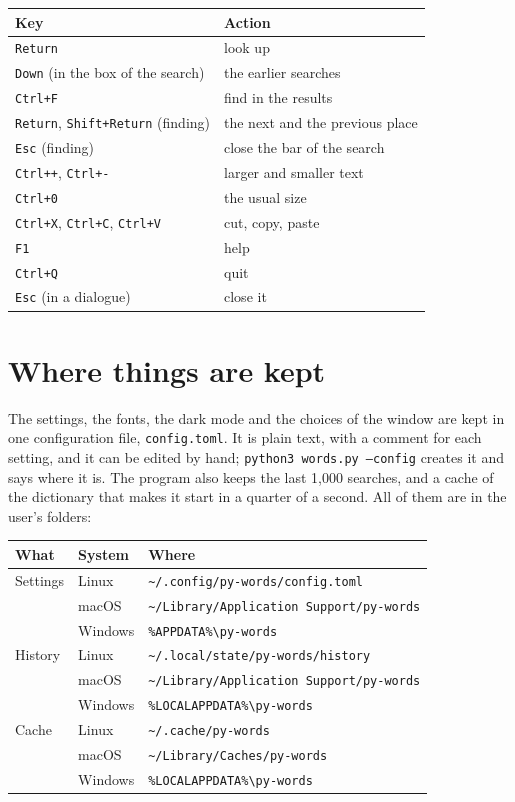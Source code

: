 \documentclass[12pt,
              article,
              oneside
              ]{memoir}
\newcommand*{\key}[1]{\texttt{#1}}
\begin{document}
%
\begin{longtable}{@{}>{\raggedright}p{}p{}@{}}
\toprule
Key & Action\\
\midrule
\endhead
\key{Return} & look up\\
\key{Down} (in the box of the search) & the earlier searches\\
\key{Ctrl+F} & find in the results\\
\key{Return}, \key{Shift+Return} (finding) & the next and the previous place\\
\key{Esc} (finding) & close the bar of the search\\
\key{Ctrl++}, \key{Ctrl+-} & larger and smaller text\\
\key{Ctrl+0} & the usual size\\
\key{Ctrl+X}, \key{Ctrl+C}, \key{Ctrl+V} & cut, copy, paste\\
\key{F1} & help\\
\key{Ctrl+Q} & quit\\
\key{Esc} (in a dialogue) & close it\\
\bottomrule
\end{longtable}

\section{Where things are kept}
\label{sec:files}

%
The settings, the fonts, the dark mode and the choices of the window are
kept in one configuration file, \texttt{config.toml}. It is plain text,
with a comment for each setting, and it can be edited by hand;
\texttt{python3 words.py --config} creates it and says where it is. The
program also keeps the last 1,000 searches, and a cache of the dictionary
that makes it start in a quarter of a second. All of them are in the
user's folders:

\begin{longtable}{@{}llp{}@{}}
\toprule
What & System & Where\\
\midrule
\endhead
Settings & Linux & \texttt{\textasciitilde/.config/py-words/config.toml}\\
 & macOS & \texttt{\textasciitilde/Library/Application Support/py-words}\\
 & Windows & \texttt{\%APPDATA\%\textbackslash py-words}\\
\addlinespace
History & Linux & \texttt{\textasciitilde/.local/state/py-words/history}\\
 & macOS & \texttt{\textasciitilde/Library/Application Support/py-words}\\
 & Windows & \texttt{\%LOCALAPPDATA\%\textbackslash py-words}\\
\addlinespace
Cache & Linux & \texttt{\textasciitilde/.cache/py-words}\\
 & macOS & \texttt{\textasciitilde/Library/Caches/py-words}\\
 & Windows & \texttt{\%LOCALAPPDATA\%\textbackslash py-words}\\
\bottomrule
\end{longtable}
\end{document}
